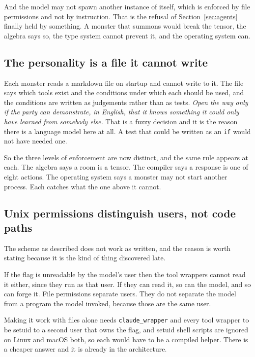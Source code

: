 \documentclass[11pt,a4paper]{article}
\begin{document}
And the model may not spawn another instance of itself, which is enforced by file permissions and
not by instruction. That is the refusal of Section~\ref{sec:agents} finally held by something. A
monster that summons would break the tensor, the algebra says so, the type system cannot prevent
it, and the operating system can.

\subsection{The personality is a file it cannot write}

Each monster reads a markdown file on startup and cannot write to it. The file says which tools
exist and the conditions under which each should be used, and the conditions are written as
judgements rather than as tests. \emph{Open the way only if the party can demonstrate, in English,
that it knows something it could only have learned from somebody else.} That is a fuzzy decision
and it is the reason there is a language model here at all. A test that could be written as an
\texttt{if} would not have needed one.

\begin{sectionbox}
So the three levels of enforcement are now distinct, and the same rule appears at each. The algebra
says a room is a tensor. The compiler says a response is one of eight actions. The operating system
says a monster may not start another process. Each catches what the one above it cannot.
\end{sectionbox}

\subsection{Unix permissions distinguish users, not code paths}

The scheme as described does not work as written, and the reason is worth stating because it is the
kind of thing discovered late.

\begin{alarmbox}
If the flag is unreadable by the model's user then the tool wrappers cannot read it either, since
they run as that user. If they can read it, so can the model, and so can forge it. File permissions
separate users. They do not separate the model from a program the model invoked, because those are
the same user.
\end{alarmbox}

Making it work with files alone needs \texttt{claude\_wrapper} and every tool wrapper to be setuid
to a second user that owns the flag, and setuid shell scripts are ignored on Linux and macOS both,
so each would have to be a compiled helper. There is a cheaper answer and it is already in the
architecture.
\end{document}
